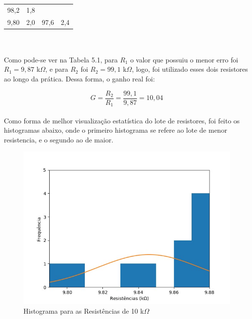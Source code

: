 \documentclass[14pt, oneside]{book}
\newcommand\tab[1][1cm]{\hspace*{#1}}
\theoremstyle{definition}
\begin{document}
\begin{table}[h]
{\begin{tabular}{ l l l l }
                            \multicolumn{1}{p{4.217cm}|}{98,2 \centering } &
                            \multicolumn{1}{p{4.217cm}|}{1,8 \centering }
                          \\  
                        \cline{1-1}\cline{2-2}\cline{3-3}\cline{4-4}  
                            \multicolumn{1}{|p{3.033cm}|}{9,80 \centering } &
                            \multicolumn{1}{p{2.267cm}|}{2,0 \centering } &
                            \multicolumn{1}{p{4.217cm}|}{97,6 \centering } &
                            \multicolumn{1}{p{4.217cm}|}{2,4 \centering }
                          \\  
                        \hline
                
                    \end{tabular}}
                \end{table}
                \\~\\
            \tab Como pode-se ver na Tabela 5.1, para $R_1$ o valor que possuiu o menor erro foi $R_1 = 9,87$ k$\Omega$, e para $R_2$ foi $R_2 = 99,1$ k$\Omega$, logo, foi utilizado esses dois resistores ao longo da prática. Dessa forma, o ganho real foi:
            
            $$G = \frac{R_2}{R_1} = \frac{99,1}{9,87} = 10,04$$
            \\
            \tab Como forma de melhor visualização estatística do lote de resistores, foi feito os histogramas abaixo, onde o primeiro histograma se refere ao lote de menor resistencia, e o segundo ao de maior. 
            \pagebreak
            \begin{figure}[H]
                \centering
                \includegraphics[scale= 0.5]{0.jpg}
                \caption{Histograma para as Resistências de 10 k$\Omega$}
                \label{fig:my_label6}
            \end{figure}
            
\end{document}
